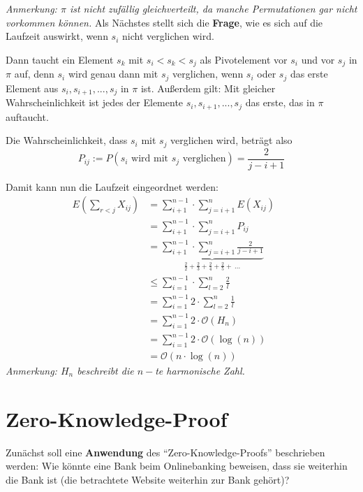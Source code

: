 \documentclass{scrartcl}%
\begin{document}
    \textit{Anmerkung: $\pi$ ist nicht zufällig gleichverteilt, da manche Permutationen gar nicht vorkommen können.}
    \newline
    Als Nächstes stellt sich die \textbf{\textsf{Frage}}, wie es sich auf die Laufzeit auswirkt, wenn $s_i$ nicht verglichen wird.

    Dann taucht ein Element $s_k$ mit $s_i < s_k < s_j$ als Pivotelement vor $s_i$ und vor $s_j$ in $\pi$ auf,
    denn $s_i$ wird genau dann mit $s_j$ verglichen, wenn $s_i$ oder $s_j$ das erste Element aus $s_i, s_{i+1}, ... , s_j$ in $\pi$ ist.
    Außerdem gilt: Mit gleicher Wahrscheinlichkeit ist jedes der Elemente $s_i, s_{i+1}, ... , s_j$ das erste, das in $\pi$ auftaucht.

    Die Wahrscheinlichkeit, dass $s_i$ mit $s_j$ verglichen wird, beträgt also
    \begin{equation*}
        P_{ij}:= P(s_i \text{ wird mit } s_j \text{ verglichen}) = \frac{2}{j-i+1}
    \end{equation*}

    Damit kann nun die Laufzeit eingeordnet werden:
    \begin{equation*}
        \begin{flalign}
            E\left(\sum_{r<j}X_{ij}\right)  &= \sum_{i+1}^{n-1} \cdot \sum_{j=i+1}^{n}E(X_{ij})&&\\\nonumber
            &= \sum_{i+1}^{n-1} \cdot \sum_{j=i+1}^{n}P_{ij}&&\\\nonumber
            &= \underbrace{\sum_{i+1}^{n-1} \cdot \sum_{j=i+1}^{n}\frac{2}{j-i+1}}_{\frac{2}{2}+\frac{2}{3}+\frac{2}{4}+\frac{2}{5}+\ ...}&&\\\nonumber
            &\leq \sum_{i=1}^{n-1} \cdot \sum_{l=2}^{n}\frac{2}{l}&&\\\nonumber
            &= \sum_{i=1}^{n-1}2 \cdot \sum_{l=2}^{n} \frac{1}{l}&&\\\nonumber
            &= \sum_{i=1}^{n-1}2 \cdot \mathcal{O}(H_n)&&\\\nonumber
            &= \sum_{i=1}^{n-1}2 \cdot \mathcal{O}(\log(n))&&\\\nonumber
            &= \mathcal{O}(n \cdot \log(n))
        \end{flalign}
    \end{equation*}
    \textit{Anmerkung: $H_n$ beschreibt die $n-$te harmonische Zahl.}

    \section*{Zero-Knowledge-Proof}
    \label{sec:zero-knowledge-proof}
    Zunächst soll eine \textbf{\textsf{Anwendung}} des "`Zero-Knowledge-Proofs"' beschrieben werden:
    Wie könnte eine Bank beim Onlinebanking beweisen, dass sie weiterhin die Bank ist (die betrachtete Website weiterhin zur Bank gehört)?
\end{document}
